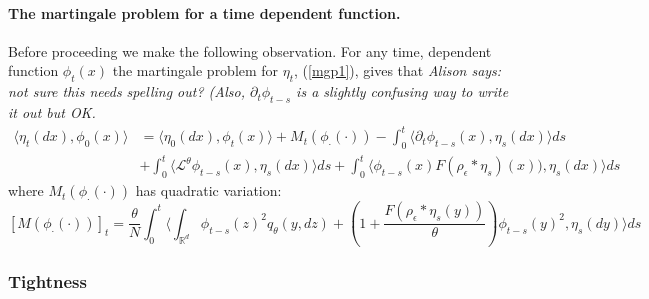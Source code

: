 \documentclass[12pt]{article}
\newcommand{\IR}{\mathbb R}
\newcommand{\comment}[1]{{\color{blue} \it #1}}
\begin{document}
\paragraph{The martingale problem for a time dependent function.}
Before proceeding we make the following observation. For any time, dependent function $\phi_t(x)$ the martingale problem for $\eta_t$, (\ref{mgp1}), gives that
\comment{Alison says: not sure this needs spelling out? (Also, $\partial_t \phi_{t-s}$ is a slightly confusing way to write it out but OK.}
\begin{align}
\langle \eta_t(dx), \phi_0(x)\rangle &= \langle \eta_0(dx), \phi_t(x)\rangle +  M_t(\phi_\cdot(\cdot)) - \int_0^t \langle \partial_t \phi_{t-s}(x), \eta_s(dx) \rangle  ds \nonumber \\ & + \int_0^t \langle \mathcal{L}^\theta \phi_{t-s}(x), \eta_s(dx) \rangle ds+ \int_{0}^t \langle \phi_{t-s}(x)F (\rho_\epsilon*\eta_s)(x) ) , \eta_s(dx) \rangle ds \label{timeMGP}
\end{align}
where $M_t(\phi_\cdot(\cdot))$ has quadratic variation:
\[ [M(\phi_\cdot(\cdot))]_t = \frac{\theta}{N}\int_0^t \langle \int_{\IR^d} \phi_{t-s}(z)^2 q_\theta(y,dz) + \left( 1 + \frac{F(\rho_\epsilon*\eta_s(y))}{\theta}\right) \phi_{t-s}(y)^2, \eta_s(dy) \rangle ds \]

\subsubsection{Tightness}
\end{document}
